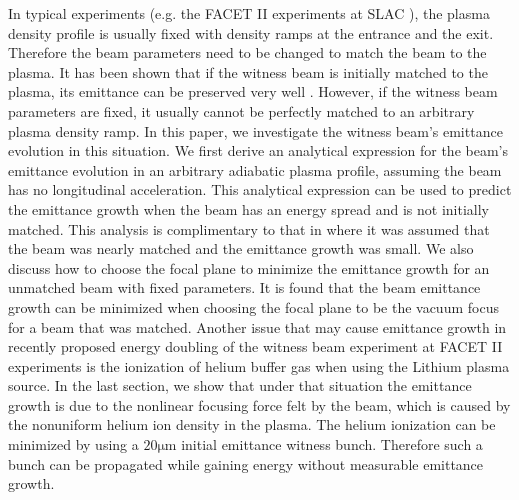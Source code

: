 \documentclass[%
reprint, superscriptaddress,
 amsmath,amssymb, aps,
prstab,
]{revtex4-2}
\begin{document}
In typical experiments (e.g. the FACET II experiments at
SLAC \cite{PWFA_FACETII}), the plasma density profile is usually fixed
with density ramps at the entrance and the exit. Therefore the beam parameters need to be changed to match the beam to the plasma. It has been shown
that if the witness beam is initially matched to the plasma, its
emittance can be preserved very well \cite{PWFA_FACETII}. However, if
the witness beam parameters are fixed, it usually cannot be perfectly matched to an arbitrary plasma density ramp. In this paper, we investigate the witness
beam's emittance evolution in this situation. We first derive an
analytical expression for the beam's emittance evolution in an arbitrary
adiabatic plasma profile, assuming the beam has no longitudinal
acceleration. This analytical expression can be used to predict the
emittance growth when the beam has an energy spread and is not initially matched. This analysis is complimentary to that in \cite{Robert} where it was assumed that the beam was nearly matched and the emittance growth was small. 
We also discuss how to choose the focal plane to minimize the emittance growth for an
unmatched beam with fixed parameters. It is found that the beam emittance growth can be minimized
when choosing the focal plane to be the vacuum focus for a beam that was matched.
Another issue that may cause emittance growth in recently proposed energy doubling of the witness beam experiment at FACET II experiments \cite{PWFA2007} is the
ionization of helium buffer gas when using the Lithium plasma source. In the last section, we show that
under that situation the emittance growth is due to the nonlinear
focusing force felt by the beam, which is caused by the nonuniform
helium ion density in the plasma. 
The helium ionization can be minimized by using a $20 \mathrm{\mu m}$ initial emittance witness bunch. Therefore such a bunch can be propagated while gaining energy without measurable emittance growth.
\end{document}
